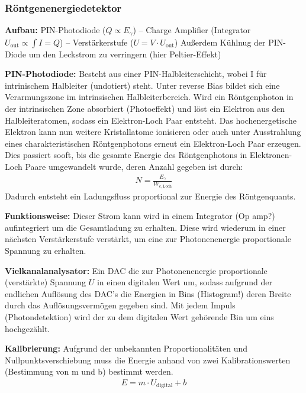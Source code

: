 \documentclass[10pt, a4paper]{article}
\begin{document}
\subsubsection{Röntgenenergiedetektor}
\label{sec:energiedetektor}
\textbf{Aufbau:} PIN-Photodiode ($Q \propto E_\gamma$) -- Charge Amplifier (Integrator $U_\mathrm{out} \propto \int I = Q$) -- Verstärkerstufe ($U = V \cdot U_\mathrm{out}$)
Außerdem Kühlnug der PIN-Diode um den Leckstrom zu verringern (hier Peltier-Effekt)

\textbf{PIN-Photodiode:} Besteht aus einer PIN-Halbleiterschicht, wobei I für intrinischem Halbleiter (undotiert) steht.
Unter reverse Bias bildet sich eine Verarmungszone im intrinsischen Halbleiterbereich.
Wird ein Röntgenphoton in der intrinsischen Zone absorbiert (Photoeffekt) und löst ein Elektron aus den Halbleiteratomen, sodass ein Elektron-Loch Paar entsteht.
Das hochenergetische Elektron kann nun weitere Kristallatome ionisieren oder auch unter Ausstrahlung eines charakteristischen Röntgenphotons erneut ein Elektron-Loch Paar erzeugen.
Dies passiert sooft, bis die gesamte Energie des Röntgenphotons in Elektronen-Loch Paare umgewandelt wurde, deren Anzahl gegeben ist durch:
\begin{align}
  N = \frac{E_\gamma}{W_{e,\mathrm{Loch}}}
\end{align}
Dadurch entsteht ein Ladungsfluss proportional zur Energie des Röntgenquants.

\textbf{Funktionsweise:} Dieser Strom kann wird in einem Integrator (Op amp?) aufintegriert um die Gesamtladung zu erhalten.
Diese wird wiederum in einer nächsten Verstärkerstufe verstärkt, um eine zur Photonenenergie proportionale Spannung zu erhalten.

\textbf{Vielkanalanalysator:} Ein DAC die zur Photonenenergie proportionale (verstärkte) Spannung $U$ in einen digitalen Wert um, sodass aufgrund der endlichen Auflösung des DAC's die Energien in Bins (Histogram!) deren Breite durch das Auflösungsvermögen gegeben sind.
Mit jedem Impuls (Photondetektion) wird der zu dem digitalen Wert gehörende Bin um eins hochgezählt.

\textbf{Kalibrierung:} Aufgrund der unbekannten Proportionalitäten und Nullpunktsverschiebung muss die Energie anhand von zwei Kalibrationswerten
(Bestimmung von m und b) bestimmt werden.
\begin{align}
  E = m \cdot U_\mathrm{digital} + b
  \label{eq:kalibrierung}
\end{align}
\end{document}

